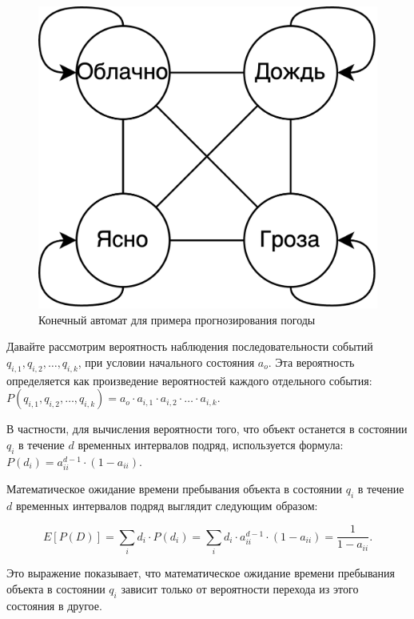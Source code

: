 \begin{figure}[H]
	\begin{center}
		\includegraphics[width=0.40\linewidth]{src/img/1/pogoda_state_machine.png}
		\caption{Конечный автомат для примера прогнозирования погоды}
		\label{fig:pogoda_state_machine}
	\end{center}
\end{figure}

Давайте рассмотрим вероятность наблюдения последовательности событий $q_{i,1}, q_{i,2}, \ldots, q_{i,k}$, при условии начального состояния $a_o$. Эта вероятность определяется как произведение вероятностей каждого отдельного события: $P(q_{i,1}, q_{i,2}, \ldots, q_{i,k}) = a_o \cdot a_{i,1} \cdot a_{i,2} \cdot \ldots \cdot a_{i,k}$.

В частности, для вычисления вероятности того, что объект останется в состоянии $q_i$ в течение $d$ временных интервалов подряд, используется формула: $P(d_i) = a_{ii}^{d-1} \cdot (1 - a_{ii})$.

Математическое ожидание времени пребывания объекта в состоянии $q_i$ в течение $d$ временных интервалов подряд выглядит следующим образом:

$$E[ P(D) ] = \sum\limits_i d_i \cdot P(d_i) = \sum\limits_i d_i \cdot a_{ii}^{d-1} \cdot (1 - a_{ii}) = \dfrac{1}{1 - a_{ii}}.$$

Это выражение показывает, что математическое ожидание времени пребывания объекта в состоянии $q_i$ зависит только от вероятности перехода из этого состояния в другое.

